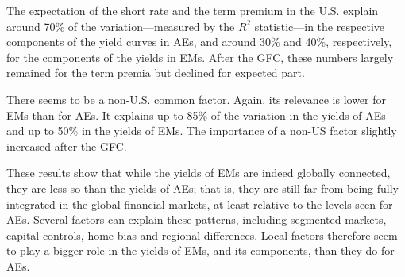 {The expectation of the short rate and the term premium in the U.S. explain around 70\% of the variation---measured by the \(R^2\) statistic---in the respective components of the yield curves in AEs, and around 30\% and 40\%, respectively, for the components of the yields in EMs. 
After the GFC, these numbers largely remained for the term premia but declined for expected part.

There seems to be a non-U.S. common factor.
Again, its relevance is lower for EMs than for AEs.
It explains up to 85\% of the variation in the yields of AEs and up to 50\% in the yields of EMs.
The importance of a non-US factor slightly increased after the GFC.

These results show that while the yields of EMs are indeed globally connected, they are less so than the yields of AEs; that is, they are still far from being fully integrated in the global financial markets, at least relative to the levels seen for AEs.
Several factors can explain these patterns, including segmented markets, capital controls, home bias and regional differences.
Local factors therefore seem to play a bigger role in the yields of EMs, and its components, than they do for AEs.

}
